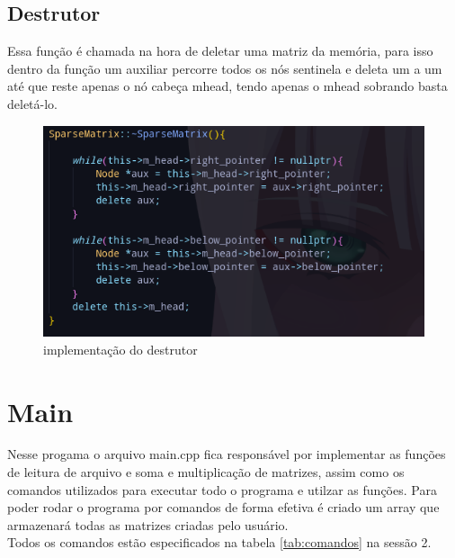 \documentclass[a4paper,12pt]{article}
\begin{document}
\subsection{Destrutor}
Essa função é chamada na hora de deletar uma matriz da memória, para isso dentro da função um auxiliar percorre todos os nós sentinela e deleta um a um até que reste apenas o nó cabeça mhead, tendo apenas o mhead sobrando basta deletá-lo. 

\begin{figure}[h]
\centering
\includegraphics[width=1\textwidth]{Imagens/sparsematrixCPP/sparsematrix-destrutor.png}
\caption{\label{fig:remove} implementação do destrutor}
\end{figure}


\section{Main}
Nesse progama o arquivo main.cpp fica responsável por implementar as funções de leitura de arquivo e soma e multiplicação de matrizes, assim como os comandos utilizados para executar todo o programa e utilzar as funções.
Para poder rodar o programa por comandos de forma efetiva é criado um array que armazenará todas as matrizes criadas pelo usuário.\\
Todos os comandos estão especificados na tabela \ref{tab:comandos} na sessão 2.
\end{document}
